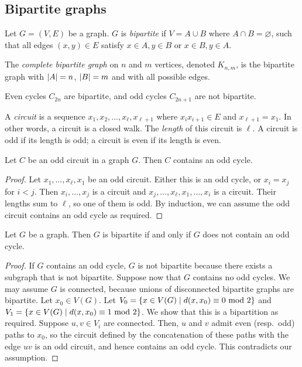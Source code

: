 \subsection{Bipartite graphs}
\begin{definition}
	Let \( G = (V, E) \) be a graph.
	\( G \) is \emph{bipartite} if \( V = A \cup B \) where \( A \cap B = \varnothing \), such that all edges \( (x,y) \in E \) satisfy \( x \in A, y \in B \) or \( x \in B, y \in A \).

	The \emph{complete bipartite graph} on \( n \) and \( m \) vertices, denoted \( K_{n,m} \), is the bipartite graph with \( \abs{A} = n \), \( \abs{B} = m \) and with all possible edges.
\end{definition}
\begin{remark}
	Even cycles \( C_{2n} \) are bipartite, and odd cycles \( C_{2n+1} \) are not bipartite.
\end{remark}
\begin{definition}
	A \emph{circuit} is a sequence \( x_1, x_2, \dots, x_\ell, x_{\ell + 1} \) where \( x_i x_{i+1} \in E \) and \( x_{\ell + 1} = x_1 \).
	In other words, a circuit is a closed walk.
	The \emph{length} of this circuit is \( \ell \).
	A circuit is odd if its length is odd; a circuit is even if its length is even.
\end{definition}
\begin{proposition}
	Let \( C \) be an odd circuit in a graph \( G \).
	Then \( C \) contains an odd cycle.
\end{proposition}
\begin{proof}
	Let \( x_1, \dots, x_\ell, x_1 \) be an odd circuit.
	Either this is an odd cycle, or \( x_i = x_j \) for \( i < j \).
	Then \( x_i, \dots, x_j \) is a circuit and \( x_j, \dots, x_\ell, x_1, \dots, x_i \) is a circuit.
	Their lengths sum to \( \ell \), so one of them is odd.
	By induction, we can assume the odd circuit contains an odd cycle as required.
\end{proof}
\begin{theorem}
	Let \( G \) be a graph.
	Then \( G \) is bipartite if and only if \( G \) does not contain an odd cycle.
\end{theorem}
\begin{proof}
	If \( G \) contains an odd cycle, \( G \) is not bipartite because there exists a subgraph that is not bipartite.
	Suppose now that \( G \) contains no odd cycles.
	We may assume \( G \) is connected, because unions of disconnected bipartite graphs are bipartite.
	Let \( x_0 \in V(G) \).
	Let \( V_0 = \qty{x \in V(G) \mid d(x,x_0) \equiv 0 \text{ mod } 2} \) and \( V_1 = \qty{x \in V(G) \mid d(x,x_0) \equiv 1 \text{ mod } 2} \).
	We show that this is a bipartition as required.
	Suppose \( u, v \in V_i \) are connected.
	Then, \( u \) and \( v \) admit even (resp.\ odd) paths to \( x_0 \), so the circuit defined by the concatenation of these paths with the edge \( uv \) is an odd circuit, and hence contains an odd cycle.
	This contradicts our assumption.
\end{proof}

